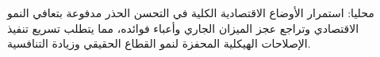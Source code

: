 محليا: استمرار الأوضاع الاقتصادية الكلية في التحسن الحذر مدفوعة بتعافي النمو الاقتصادي وتراجع عجز الميزان الجاري وأعباء فوائده، مما يتطلب تسريع تنفيذ الإصلاحات الهيكلية المحفزة لنمو القطاع الحقيقي وزيادة التنافسية.
